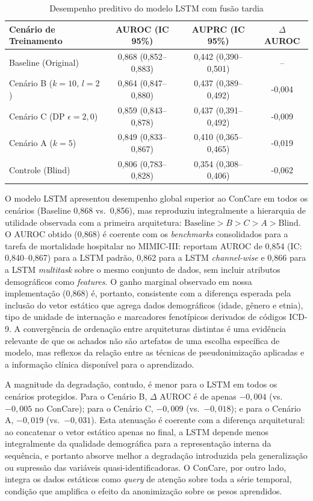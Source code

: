 \begin{table}[ht]
\centering
\caption{Desempenho preditivo do modelo LSTM com fusão tardia}
\label{tab:utilidade-lstm}
\small
\setlength{\tabcolsep}{3pt}
\begin{tabular}{l|c|c|c}
\hline
\textbf{Cenário de Treinamento} & \textbf{AUROC (IC 95\%)} & \textbf{AUPRC (IC 95\%)} & \textbf{$\Delta$ AUROC} \\ \hline
Baseline (Original)             & 0,868 (0,852--0,883) & 0,442 (0,390--0,501) & --     \\ \hline
Cenário B ($k=10$, $l=2$)       & 0,864 (0,847--0,880) & 0,437 (0,389--0,492) & -0,004 \\
Cenário C (DP $\epsilon=2{,}0$) & 0,859 (0,843--0,878) & 0,437 (0,391--0,492) & -0,009 \\
Cenário A ($k=5$)               & 0,849 (0,833--0,867) & 0,410 (0,365--0,465) & -0,019 \\ \hline
Controle (Blind)                & 0,806 (0,783--0,828) & 0,354 (0,308--0,406) & -0,062 \\ \hline
\end{tabular}
\end{table}

O modelo LSTM apresentou desempenho global superior ao ConCare em todos os cenários (Baseline 0,868 vs.\ 0,856), mas reproduziu integralmente a hierarquia de utilidade observada com a primeira arquitetura: $\text{Baseline} > B > C > A > \text{Blind}$. O AUROC obtido (0,868) é coerente com os \textit{benchmarks} consolidados para a tarefa de mortalidade hospitalar no MIMIC-III:  reportam AUROC de 0,854 (IC: 0,840--0,867) para a LSTM padrão, 0,862 para a LSTM \textit{channel-wise} e 0,866 para a LSTM \textit{multitask} sobre o mesmo conjunto de dados, sem incluir atributos demográficos como \textit{features}. O ganho marginal observado em nossa implementação (0,868) é, portanto, consistente com a diferença esperada pela inclusão do vetor estático que agrega dados demográficos (idade, gênero e etnia), tipo de unidade de internação e marcadores fenotípicos derivados de códigos ICD-9. A convergência de ordenação entre arquiteturas distintas é uma evidência relevante de que os achados não são artefatos de uma escolha específica de modelo, mas reflexos da relação entre as técnicas de pseudonimização aplicadas e a informação clínica disponível para o aprendizado.

A magnitude da degradação, contudo, é menor para o LSTM em todos os cenários protegidos. Para o Cenário B, $\Delta$ AUROC é de apenas $-0{,}004$ (vs.\ $-0{,}005$ no ConCare); para o Cenário C, $-0{,}009$ (vs.\ $-0{,}018$); e para o Cenário A, $-0{,}019$ (vs.\ $-0{,}031$). Esta atenuação é coerente com a diferença arquitetural: ao concatenar o vetor estático apenas no final, a LSTM depende menos integralmente da qualidade demográfica para a representação interna da sequência, e portanto absorve melhor a degradação introduzida pela generalização ou supressão das variáveis quasi-identificadoras. O ConCare, por outro lado, integra os dados estáticos como \textit{query} de atenção sobre toda a série temporal, condição que amplifica o efeito da anonimização sobre os pesos aprendidos.

